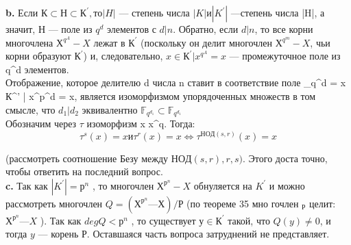\documentclass{../../template/mai_book}
\begin{document}
{{\hspace*{15pt}\textbf{b.} Если $К \subset Н \subset К^{'}, то |H|$ --- степень числа $|K| и |K^{'}|$ ---степень\linebreak
числа |H|, а значит, Н — поле из $q^{d}$ элементов с $d | n$. Обратно, если\linebreak
$d | n$, то все корни многочлена $Х^{q^{A}} - X$ лежат в $К^{'}$ (поскольку он\linebreak
делит многочлен $Х^{q^{m}} - X$, чьи корни образуют $К^{'}$) и, следовательно,\linebreak
${x \in К^{'} | x^{q^{A}} = x}$ --- промежуточное поле из q^d элементов.\\
\hspace*{0pt} Отображение, которое делителю d числа n ставит в соответствие
поле _{q^{d}} = {x \in К^{'} | x^{p^{d}}  = x}, является изоморфизмом упорядоченных\linebreak
множеств в том смысле, что $d_1 | d_2$ эквивалентно $\mathbb{F}_{q^{d_1}} \subset \mathbb{F}_{q^{d_1}}$\\
\hspace*{0pt}Обозначим через $\tau$ изоморфизм x \mapsto x^{q}. Тогда:
$$\tau^{s}(x) = x и \tau^{r}(x) = x \Longleftrightarrow \tau^{НОД(s, r)}(x) = x$$

(рассмотреть соотношение Безу между $НОД(s,r), r, s)$. Этого доста­\linebreak
точно, чтобы ответить на последний вопрос.\\

\hspace*{15pt}\textbf{c.} Так как $|K^{'}| = р^{n}$ , то многочлен $Х^{р^n} - X$ обнуляется на $K^{'}$ и\linebreak
можно рассмотреть многочлен $Q = (Х^{р^{n}} — Х )/Р$ (по теореме 35 мно­\linebreak
гочлен $_Р$ целит: $Х^{р^{n}} — X$ ). Так как $degQ < р^{n}$ , то существует $у \in К^{'}$\linebreak
такой, что $Q(y) \neq 0$, и тогда $y$ — корень $Р$. Оставшаяся часть вопроса \linebreak
затруднений не представляет.\\

}}
\end{document}
